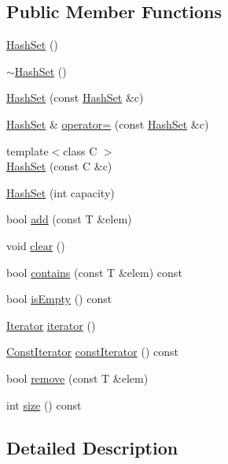 \subsection*{Public Member Functions}
\begin{DoxyCompactItemize}
\item 
\hyperlink{class_hash_set_ac59c9d9b1952ad325f8ecce3088fa49e}{HashSet} ()
\item 
\hyperlink{class_hash_set_aa934b0583360b04ae4f16af3861e2286}{$\sim$HashSet} ()
\item 
\hyperlink{class_hash_set_af159fc24c29460b1af57b979e19d7cf8}{HashSet} (const \hyperlink{class_hash_set}{HashSet} \&c)
\item 
\hyperlink{class_hash_set}{HashSet} \& \hyperlink{class_hash_set_a0332fe3d59e16ba2db8ee4ef9df5e25a}{operator=} (const \hyperlink{class_hash_set}{HashSet} \&c)
\item 
{\footnotesize template$<$class C $>$ }\\\hyperlink{class_hash_set_a7f67475b071394062251c44b67f7156e}{HashSet} (const C \&c)
\item 
\hyperlink{class_hash_set_a8ac5b8b9efdc5cea188f26291264b7e5}{HashSet} (int capacity)
\item 
bool \hyperlink{class_hash_set_a372828f1f3db2cd77ece30ae028bae38}{add} (const T \&elem)
\item 
void \hyperlink{class_hash_set_a3b138200e3e1571572e89c0da47e07e3}{clear} ()
\item 
bool \hyperlink{class_hash_set_ad5d4c93b3cf750c4ed983b3bf92c1b30}{contains} (const T \&elem) const 
\item 
bool \hyperlink{class_hash_set_a1893b49141da8f144b6ec2a66d8ea80e}{isEmpty} () const 
\item 
\hyperlink{class_hash_set_1_1_iterator}{Iterator} \hyperlink{class_hash_set_a4c32a5782f450ff3946e2f9876f0c6da}{iterator} ()
\item 
\hyperlink{class_hash_set_1_1_const_iterator}{ConstIterator} \hyperlink{class_hash_set_af21ade72c48d9e4f315994b50192efec}{constIterator} () const 
\item 
bool \hyperlink{class_hash_set_add07e569cdcf534278ab1039d511b715}{remove} (const T \&elem)
\item 
int \hyperlink{class_hash_set_a21e68de8656af694da61d7aadd04add9}{size} () const 
\end{DoxyCompactItemize}


\subsection{Detailed Description}
